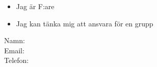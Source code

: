 \begin{multicols}{2}
\begin{multicols}{2}
\begin{itemize}
        \end{itemize}
    \end{multicols}
    \begin{itemize}
        \item Jag är F:are
        \item Jag kan tänka mig att ansvara för en grupp
    \end{itemize}
    \normalsize
    Namn:\underline{\hspace{4.62cm}}\\
    Email:\underline{\hspace{4.71cm}}\\
    Telefon:\underline{\hspace{4.471cm}}
\end{multicols}
